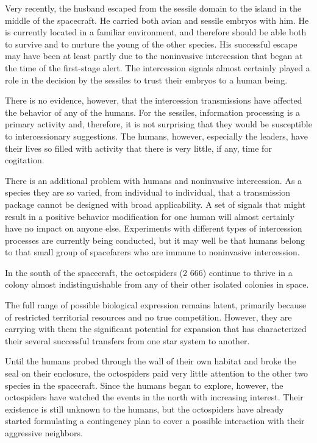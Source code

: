 \documentclass[]{article}
\begin{document}
{{Very recently, the husband escaped from the sessile domain to the island in the middle of the spacecraft. He carried both avian and sessile embryos with him. He is currently located in a familiar environment, and therefore should be able both to survive and to nurture the young of the other species. His successful escape may have been at least partly due to the noninvasive intercession that began at the time of the first-stage alert. The intercession signals almost certainly played a role in the decision by the sessiles to trust their embryos to a human being.

There is no evidence, however, that the intercession transmissions have affected the behavior of any of the humans. For the sessiles, information processing is a primary activity and, therefore, it is not surprising that they would be susceptible to intercessionary suggestions. The humans, however, especially the leaders, have their lives so filled with activity that there is very little, if any, time for cogitation.

There is an additional problem with humans and noninvasive intercession. As a species they are so varied, from individual to individual, that a transmission package cannot be designed with broad applicability. A set of signals that might result in a positive behavior modification for one human will almost certainly have no impact on anyone else. Experiments with different types of intercession processes are currently being conducted, but it may well be that humans belong to that small group of spacefarers who are immune to noninvasive intercession.

In the south of the spacecraft, the octospiders (2 666) continue to thrive in a colony almost indistinguishable from any of their other isolated colonies in space.

The full range of possible biological expression remains latent, primarily because of restricted territorial resources and no true competition. However, they are carrying with them the significant potential for expansion that has characterized their several successful transfers from one star system to another.

Until the humans probed through the wall of their own habitat and broke the seal on their enclosure, the octospiders paid very little attention to the other two species in the spacecraft. Since the humans began to explore, however, the octospiders have watched the events in the north with increasing interest. Their existence is still unknown to the humans, but the octospiders have already started formulating a contingency plan to cover a possible interaction with their aggressive neighbors.

}}
\end{document}
